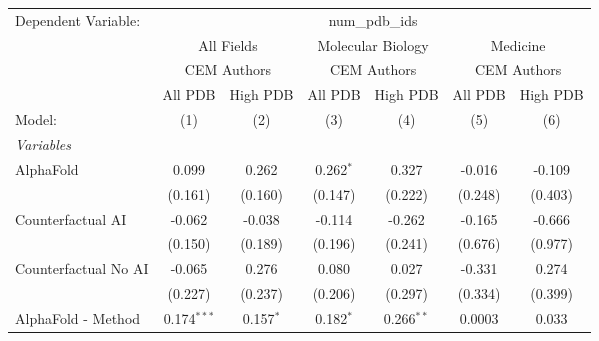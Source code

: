 \begingroup
\centering
\begin{tabular}{lcccccc}
   \tabularnewline \midrule \midrule
   Dependent Variable: & \multicolumn{6}{c}{num\_pdb\_ids}\\
 & \multicolumn{2}{c}{All Fields} & \multicolumn{2}{c}{Molecular Biology} & \multicolumn{2}{c}{Medicine} \\
\cmidrule(lr){2-3} \cmidrule(lr){4-5} \cmidrule(lr){6-7}
 & \multicolumn{2}{c}{CEM Authors} & \multicolumn{2}{c}{CEM Authors} & \multicolumn{2}{c}{CEM Authors} \\
\cmidrule(lr){2-3} \cmidrule(lr){4-5} \cmidrule(lr){6-7}
 & \multicolumn{1}{c}{All PDB} & \multicolumn{1}{c}{High PDB} & \multicolumn{1}{c}{All PDB} & \multicolumn{1}{c}{High PDB} & \multicolumn{1}{c}{All PDB} & \multicolumn{1}{c}{High PDB} \\
\cmidrule(lr){2-2} \cmidrule(lr){3-3} \cmidrule(lr){4-4} \cmidrule(lr){5-5} \cmidrule(lr){6-6} \cmidrule(lr){7-7}
   Model:                                                     & (1)           & (2)           & (3)           & (4)           & (5)          & (6)\\  
   \midrule
   \emph{Variables}\\
   AlphaFold                                                  & 0.099         & 0.262         & 0.262$^{*}$   & 0.327         & -0.016       & -0.109\\   
                                                              & (0.161)       & (0.160)       & (0.147)       & (0.222)       & (0.248)      & (0.403)\\   
   Counterfactual AI                                          & -0.062        & -0.038        & -0.114        & -0.262        & -0.165       & -0.666\\   
                                                              & (0.150)       & (0.189)       & (0.196)       & (0.241)       & (0.676)      & (0.977)\\   
   Counterfactual No AI                                       & -0.065        & 0.276         & 0.080         & 0.027         & -0.331       & 0.274\\   
                                                              & (0.227)       & (0.237)       & (0.206)       & (0.297)       & (0.334)      & (0.399)\\   
   AlphaFold - Method                                         & 0.174$^{***}$ & 0.157$^{*}$   & 0.182$^{*}$   & 0.266$^{**}$  & 0.0003       & 0.033\\   

\end{tabular}
